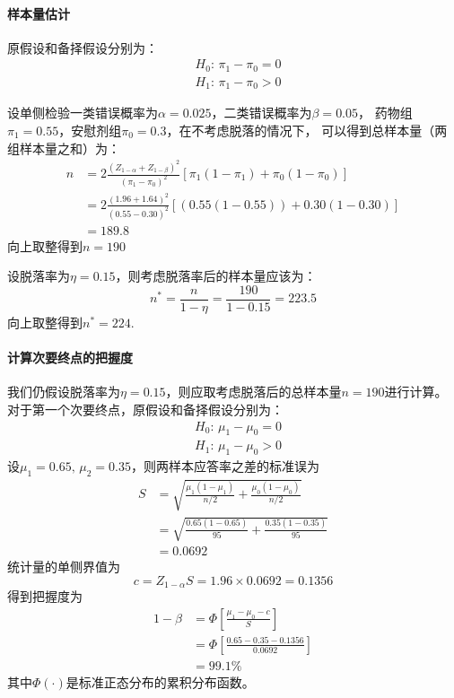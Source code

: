 \documentclass{article}
\begin{document}
\paragraph{样本量估计}
原假设和备择假设分别为：
\begin{align*}
    &H_0: \, \pi_1 - \pi_0 = 0\\
    &H_1: \,\pi_1 - \pi_0 > 0
\end{align*}

设单侧检验一类错误概率为$\alpha=0.025$，二类错误概率为$\beta=0.05$，
药物组$\pi_1=0.55$，安慰剂组$\pi_0=0.3$，在不考虑脱落的情况下，
可以得到总样本量（两组样本量之和）为：
\begin{align*}
    n &= 2\frac{(Z_{1-\alpha}+Z_{1-\beta})^2}{(\pi_1-\pi_0)^2}\left[\pi_1(1-\pi_1)+\pi_0(1-\pi_0)\right]\\
      &= 2\frac{(1.96+1.64)^2}{(0.55-0.30)^2}\left[ (0.55(1-0.55)) + 0.30(1-0.30) \right]\\
      &= 189.8
\end{align*}
向上取整得到$n=190$

设脱落率为$\eta=0.15$，则考虑脱落率后的样本量应该为：
\begin{equation*}
    n^* = \frac{n}{1-\eta} = \frac{190}{1-0.15} = 223.5
\end{equation*}
向上取整得到$n^* = 224$.

\paragraph{计算次要终点的把握度}
我们仍假设脱落率为$\eta=0.15$，则应取考虑脱落后的总样本量$n=190$进行计算。
对于第一个次要终点，原假设和备择假设分别为：
\begin{align*}
    &H_0: \, \mu_1 - \mu_0 = 0\\
    &H_1: \,\mu_1 - \mu_0 > 0
\end{align*}
设$\mu_1=0.65,\, \mu_2=0.35$，则两样本应答率之差的标准误为
\begin{align*}
    S &= \sqrt{\frac{\mu_1(1-\mu_1)}{n/2}+\frac{\mu_0(1-\mu_0)}{n/2}}\\
    &= \sqrt{\frac{0.65(1-0.65)}{95}+\frac{0.35(1-0.35)}{95}}\\
    &=0.0692
\end{align*}
统计量的单侧界值为
\[c=Z_{1-\alpha}S=1.96\times0.0692=0.1356\]
得到把握度为
\begin{align*}
    1-\beta &= \varPhi \left[\frac{\mu_1-\mu_0-c}{S}\right] \\
            &= \varPhi \left[\frac{0.65-0.35-0.1356}{0.0692}\right] \\
            & = 99.1\%
\end{align*}
其中$\varPhi(\cdot )$是标准正态分布的累积分布函数。
\end{document}
